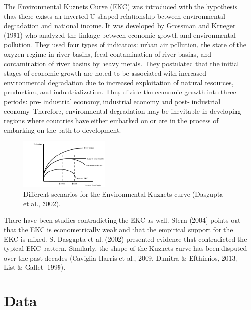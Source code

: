 \documentclass[doublespace,times,Afour,review]{template/sagej}
\begin{document}
The Environmental Kuznets Curve (EKC) was introduced with the hypothesis that there exists an inverted U-shaped relationship between environmental degradation and national income. It was developed by Grossman and Krueger (1991) who analyzed the linkage between economic growth and environmental pollution. They used four types of indicators: urban air pollution, the state of the oxygen regime in river basins, fecal contamination of river basins, and contamination of river basins by heavy metals. They postulated that the initial stages of economic growth are noted to be associated with increased environmental degradation due to increased exploitation of natural resources, production, and industrialization. They divide the economic growth into three periods: pre- industrial economy, industrial economy and post- industrial economy. Therefore, environmental degradation may be inevitable in developing regions where countries have either embarked on or are in the process of embarking on the path to development.


\begin{figure}[h]
    \centering
    \includegraphics[width=0.4\textwidth]{images/kuznets_scen.png}
    \caption{Different scenarios for the Environmental Kuznets curve (Dasgupta et al., 2002).}
\end{figure}


There have been studies contradicting the EKC as well. Stern (2004) points out that the EKC is econometrically weak and that the empirical support for the EKC is mixed. S. Dasgupta et al. (2002) presented evidence that contradicted the typical EKC pattern. Similarly, the shape of the Kuznets curve has been disputed over the past decades (Caviglia-Harris et al., 2009, Dimitra \& Efthimios, 2013, List \& Gallet, 1999). 



\section{Data}
\end{document}
